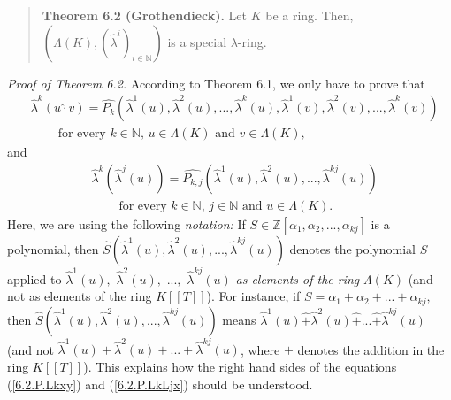 \documentclass[numbers=enddot,12pt,final,onecolumn,notitlepage]{scrartcl}%
\begin{document}
\begin{quote}
\textbf{Theorem 6.2 (Grothendieck).} Let $K$ be a ring. Then, $\left(
\Lambda\left(  K\right)  ,\left(  \widehat{\lambda}^{i}\right)  _{i\in
\mathbb{N}}\right)  $ is a special $\lambda$-ring.
\end{quote}

\textit{Proof of Theorem 6.2.} According to Theorem 6.1, we only have to prove
that%
\begin{align}
&  \widehat{\lambda}^{k}\left(  u\widehat{\cdot}v\right)  =\widehat{P_{k}%
}\left(  \widehat{\lambda}^{1}\left(  u\right)  ,\widehat{\lambda}^{2}\left(
u\right)  ,...,\widehat{\lambda}^{k}\left(  u\right)  ,\widehat{\lambda}%
^{1}\left(  v\right)  ,\widehat{\lambda}^{2}\left(  v\right)
,...,\widehat{\lambda}^{k}\left(  v\right)  \right) \nonumber\\
&  \ \ \ \ \ \ \ \ \ \ \text{for every }k\in\mathbb{N}\text{, }u\in
\Lambda\left(  K\right)  \text{ and }v\in\Lambda\left(  K\right)  ,
\label{6.2.P.Lkxy}%
\end{align}
and%
\begin{align}
&  \widehat{\lambda}^{k}\left(  \widehat{\lambda}^{j}\left(  u\right)
\right)  =\widehat{P_{k,j}}\left(  \widehat{\lambda}^{1}\left(  u\right)
,\widehat{\lambda}^{2}\left(  u\right)  ,...,\widehat{\lambda}^{kj}\left(
u\right)  \right) \nonumber\\
&  \ \ \ \ \ \ \ \ \ \ \text{for every }k\in\mathbb{N}\text{, }j\in
\mathbb{N}\text{ and }u\in\Lambda\left(  K\right)  . \label{6.2.P.LkLjx}%
\end{align}
Here, we are using the following \textit{notation:} If $S\in\mathbb{Z}\left[
\alpha_{1},\alpha_{2},...,\alpha_{kj}\right]  $ is a polynomial, then
$\widehat{S}\left(  \widehat{\lambda}^{1}\left(  u\right)  ,\widehat{\lambda
}^{2}\left(  u\right)  ,...,\widehat{\lambda}^{kj}\left(  u\right)  \right)  $
denotes the polynomial $S$ applied to $\widehat{\lambda}^{1}\left(  u\right)
,$ $\widehat{\lambda}^{2}\left(  u\right)  ,$ $...,$ $\widehat{\lambda}%
^{kj}\left(  u\right)  $ \textit{as elements of the ring }$\Lambda\left(
K\right)  $ (and not as elements of the ring $K\left[  \left[  T\right]
\right]  $). For instance, if $S=\alpha_{1}+\alpha_{2}+...+\alpha_{kj},$ then
$\widehat{S}\left(  \widehat{\lambda}^{1}\left(  u\right)  ,\widehat{\lambda
}^{2}\left(  u\right)  ,...,\widehat{\lambda}^{kj}\left(  u\right)  \right)  $
means $\widehat{\lambda}^{1}\left(  u\right)  \widehat{+}\widehat{\lambda}%
^{2}\left(  u\right)  \widehat{+}...\widehat{+}\widehat{\lambda}^{kj}\left(
u\right)  $ (and not $\widehat{\lambda}^{1}\left(  u\right)  +\widehat{\lambda
}^{2}\left(  u\right)  +...+\widehat{\lambda}^{kj}\left(  u\right)  $, where
$+$ denotes the addition in the ring $K\left[  \left[  T\right]  \right]  $).
This explains how the right hand sides of the equations (\ref{6.2.P.Lkxy}) and
(\ref{6.2.P.LkLjx}) should be understood.
\end{document}
